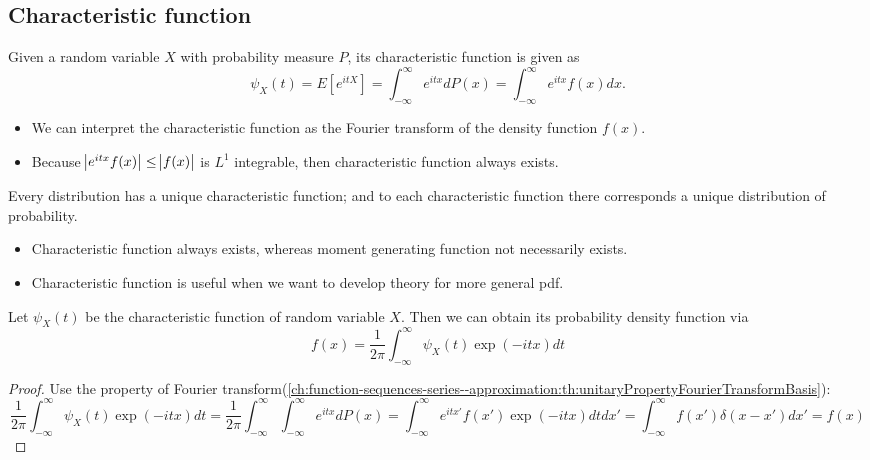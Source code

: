 \begin{refsection}
\subsection{Characteristic function}
\begin{definition}
	Given a random variable $X$ with probability measure $P$, its characteristic function is given as
	$$\psi_X(t) = E[e^{itX}] = \int_{-\infty}^{\infty} e^{itx}dP(x) = \int_{-\infty}^{\infty} e^{itx}f(x)dx.$$
	
\end{definition}

\begin{remark}\hfill
\begin{itemize}
	\item We can interpret the characteristic function as the Fourier transform of the density function $f(x)$.
	\item Because $\abs{e^{itx}f(x)}\leq \abs{f(x)}$ is $L^1$ integrable, then characteristic function always exists. 
\end{itemize}

\end{remark}

\begin{lemma}
Every distribution has a unique characteristic function; and to each characteristic function there corresponds a unique distribution of probability.		
\end{lemma}


\begin{remark}\hfill
\begin{itemize}
	\item Characteristic function always exists, whereas moment generating function not necessarily exists.
	\item Characteristic function is useful when we want to develop theory for more general pdf.
\end{itemize}
\end{remark}

\begin{lemma}
Let $\psi_X(t)$ be the characteristic function of random variable $X$. Then we can obtain its probability density function via
$$f(x) = \frac{1}{2\pi} \int_{-\infty}^{\infty} \psi_X(t)\exp(-itx)dt$$	
\end{lemma}
\begin{proof}
Use the property of Fourier transform(\autoref{ch:function-sequences-series--approximation:th:unitaryPropertyFourierTransformBasis}):
$$\frac{1}{2\pi} \int_{-\infty}^{\infty} \psi_X(t)\exp(-itx)dt = \frac{1}{2\pi} \int_{-\infty}^{\infty} \int_{-\infty}^{\infty} e^{itx}dP(x) = \int_{-\infty}^{\infty} e^{itx'}f(x')\exp(-itx)dtdx' = \int_{-\infty}^{\infty} f(x')\delta(x-x')dx' = f(x)$$
\end{proof}




\end{refsection}
